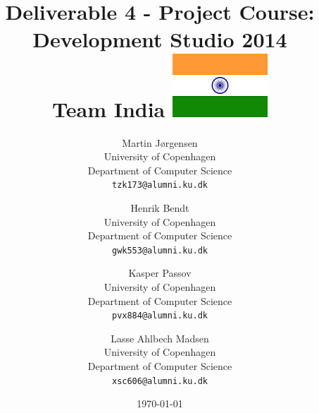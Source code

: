 \documentclass[a4paper,11pt]{article}
\title{Deliverable 4 - Project Course: Development Studio 2014 \\ Team India \includegraphics[width=.04\textwidth]{img/india.png}}
\author
{
    Martin Jørgensen \\ 
    University of Copenhagen \\
    Department of Computer Science \\
    {\tt tzk173@alumni.ku.dk}
    \and
    Henrik Bendt \\
    University of Copenhagen \\
    Department of Computer Science \\
    {\tt gwk553@alumni.ku.dk}
    \and
    Kasper Passov \\
    University of Copenhagen \\
    Department of Computer Science \\
    {\tt pvx884@alumni.ku.dk}
    \and
    Lasse Ahlbech Madsen \\
    University of Copenhagen \\
    Department of Computer Science \\
    {\tt xsc606@alumni.ku.dk}
}
\date{\today}
\begin{document}
\maketitle

\tableofcontents
\pagebreak




\end{document}
